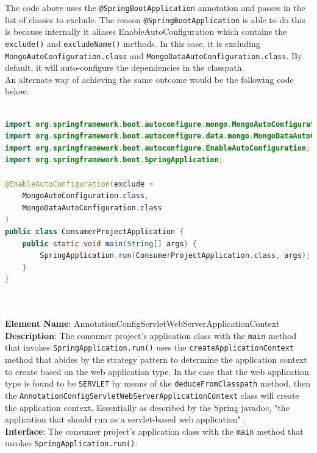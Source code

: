 {The code above uses the \texttt{@SpringBootApplication} annotation and passes in the list of classes to exclude. The reason \texttt{@SpringBootApplication} is able to do this is because internally it aliases EnableAutoConfiguration which contains the \texttt{exclude()} and \texttt{excludeName()} methods. In this case, it is excluding \texttt{MongoAutoConfiguration.class} and \texttt{MongoDataAutoConfiguration.class}. By default, it will auto-configure the dependencies in the classpath.\\

An alternate way of achieving the same outcome would be the following code below:\\

\begin{lstlisting}[language=Java, caption=Consumer Project Auto-Configuring Dependencies using EnableAutoConfiguration, label=AutoConfigurationImportSelector]

import org.springframework.boot.autoconfigure.mongo.MongoAutoConfiguration;
import org.springframework.boot.autoconfigure.data.mongo.MongoDataAutoConfiguration;
import org.springframework.boot.autoconfigure.EnableAutoConfiguration;
import org.springframework.boot.SpringApplication;

@EnableAutoConfiguration(exclude =
	MongoAutoConfiguration.class,
    MongoDataAutoConfiguration.class
)
public class ConsumerProjectApplication {
	public static void main(String[] args) {
        SpringApplication.run(ConsumerProjectApplication.class, args);
    }
}
\end{lstlisting}\ \\

\noindent\makebox[\linewidth]{\rule{\textwidth}{3pt}}\ \\

\textbf{Element Name}: AnnotationConfigServletWebServerApplicationContext\\
\textbf{Description}: The consumer project's application class with the \texttt{main} method that invokes \texttt{SpringApplication.run()} uses the \texttt{createApplicationContext} method that abides by the strategy pattern to determine the application context to create based on the web application type. In the case that the web application type is found to be \texttt{SERVLET} by means of the \texttt{deduceFromClasspath} method, then the \texttt{AnnotationConfigServletWebServerApplicationContext} class will create the application context. Essentially as described by the Spring javadoc, "the application that should run as a servlet-based web application" \cite{springjavadoc:onlineWebApplicationType}.\\
\textbf{Interface}: The consumer project's application class with the \texttt{main} method that invokes \texttt{SpringApplication.run()}:\\

}
